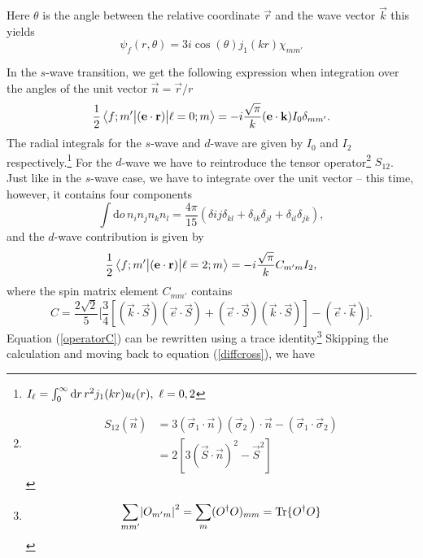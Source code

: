 Here $\theta$ is the angle between the relative coordinate $\vec{r}$ and the wave vector $\vec{k}$ this yields
\begin{equation}
	\psi_f(r,\theta) = 3i\cos(\theta)j_1(kr)\chi_{mm'}
\end{equation}

In the $s$-wave transition, we get the following expression when integration over the angles of the unit vector $\vec{n}=\vec{r}/r$
\begin{equation}
	\frac{1}{2}\mel{f;m'}{(\bm{\mathrm{e}}\cdot\bm{\mathrm{r}})}{\ell=0;m} = -i\frac{\sqrt{\pi}}{k} (\bm{\mathrm{e}}\cdot\bm{\mathrm{k}} )I_0 \delta_{mm'}.
\end{equation}
The radial integrals for the $s$-wave and $d$-wave are given by $I_0$ and $I_2$ respectively.\footnote{$I_\ell = \int_0^\infty \textrm{d}r \, r^2 j_1(kr)u_\ell(r), \\ \, \, \ell=0,2$}
For the $d$-wave we have to reintroduce the tensor operator\footnote{\begin{align*}
		S_{12}(\vec{n})&=3(\vec{\sigma}_1\cdot \vec{n})(\vec{\sigma}_2)\cdot\vec{n}-(\vec{\sigma}_1\cdot\vec{\sigma}_2) \\
		&= 2[3(\vec{S}\cdot\vec{n})^2-\vec{S}^2]
\end{align*}} $S_12$. Just like in the $s$-wave case, we have to integrate over the unit vector -- this time, however, it contains four components
\begin{equation}
	\int \textrm{d}o \, n_i n_j n_k n_l = \frac{4\pi}{15}(\delta{ij}\delta_{kl}+\delta_{ik}\delta_{jl}+\delta_{il}\delta_{jk}),
\end{equation}
and the $d$-wave contribution is given by
\begin{equation}
	\frac{1}{2}\mel{f;m'}{(\bm{\mathrm{e}}\cdot \bm{\mathrm{r}})}{\ell=2;m} = -i\frac{\sqrt{\pi}}{k}C_{m'm}I_2,
\end{equation}
where the spin matrix element $C_{mm'}$ contains
\begin{equation}\label{operatorC}
	C= \frac{2\sqrt{2}}{5} \Big[ \frac{3}{4}\left[ (\vec{k}\cdot \vec{S})(\vec{e}\cdot \vec{S})+(\vec{e}\cdot \vec{S})(\vec{k}\cdot \vec{S})\right] -(\vec{e}\cdot \vec{k}) \Big].
\end{equation}
Equation (\ref{operatorC}) can be rewritten using a trace identity\footnote{\begin{align*}
		\sum_{mm'}\abs{O_{m'm}}^2=\sum_m (O^\dagger O)_{mm} = \text{Tr}\{ O^\dagger O \}
\end{align*}}
Skipping the calculation and moving back to equation (\ref{diffcross}), we have
